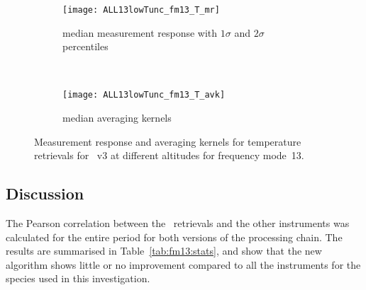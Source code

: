 \begin{figure}[tbhp]
    \centering
    \begin{subfigure}[b]{0.49\textwidth}
        \texttt{[image: ALL13lowTunc\_fm13\_T\_mr]}
        \caption{median measurement response with $1\sigma$ and $2\sigma$
        percentiles}
        \label{fig:fm13:T:mr}
    \end{subfigure}
    \,
    \begin{subfigure}[b]{0.49\textwidth}
        \texttt{[image: ALL13lowTunc\_fm13\_T\_avk]}
        \caption{median averaging kernels\newline~}
        \label{fig:fm13:T:avk}
    \end{subfigure}
    \caption{Measurement response and averaging kernels for temperature
    retrievals for \smr~v3 at different altitudes for frequency mode~13.}
    \label{fig:fm13:T:mr_avk}
\end{figure}


\subsection{Discussion}
\label{sec:fm13:discussion}
The Pearson correlation between the \smr\ retrievals and the other instruments
was calculated for the entire period for both versions of the processing chain.
The results are summarised in Table~\ref{tab:fm13:stats}, and show that the
new algorithm shows little or no improvement compared to all the instruments
for the species used in this investigation.


